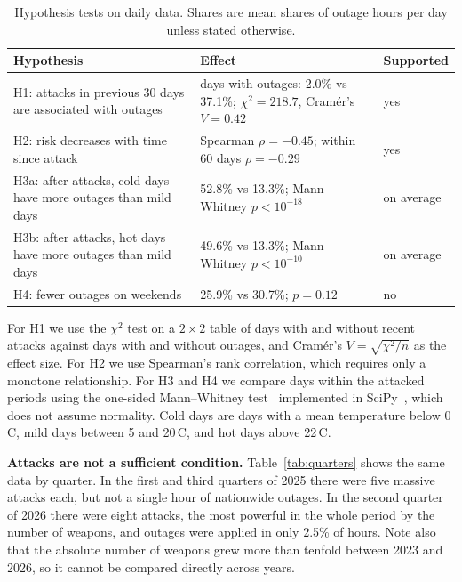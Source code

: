 \documentclass[9pt,twocolumn,letterpaper]{extarticle}
\begin{document}
\begin{table}[t]
\centering\small
\caption{Hypothesis tests on daily data. Shares are mean shares of outage hours per day unless stated otherwise.}
\label{tab:tests}
\begin{tabular}{@{}p{2.75cm}p{3.05cm}l@{}}
\toprule
Hypothesis & Effect & Supported \\
\midrule
H1: attacks in previous 30 days are associated with outages & days with outages: 2.0\% vs 37.1\%; $\chi^2 = 218.7$, Cram\'er's $V = 0.42$ & yes \\
\addlinespace
H2: risk decreases with time since attack & Spearman $\rho = -0.45$; within 60 days $\rho = -0.29$ & yes \\
\addlinespace
H3a: after attacks, cold days have more outages than mild days & 52.8\% vs 13.3\%; Mann--Whitney $p < 10^{-18}$ & on average \\
\addlinespace
H3b: after attacks, hot days have more outages than mild days & 49.6\% vs 13.3\%; Mann--Whitney $p < 10^{-10}$ & on average \\
\addlinespace
H4: fewer outages on weekends & 25.9\% vs 30.7\%; $p = 0.12$ & no \\
\bottomrule
\end{tabular}
\end{table}

For H1 we use the $\chi^2$ test on a $2\times2$ table of days with and without recent attacks against days with and without outages, and Cram\'er's $V=\sqrt{\chi^2/n}$ as the effect size. For H2 we use Spearman's rank correlation, which requires only a monotone relationship. For H3 and H4 we compare days within the attacked periods using the one-sided Mann--Whitney test~\cite{mann} implemented in SciPy~\cite{scipy}, which does not assume normality. Cold days are days with a mean temperature below 0\,\textdegree C, mild days between 5 and 20\,\textdegree C, and hot days above 22\,\textdegree C.

\textbf{Attacks are not a sufficient condition.} Table~\ref{tab:quarters} shows the same data by quarter. In the first and third quarters of 2025 there were five massive attacks each, but not a single hour of nationwide outages. In the second quarter of 2026 there were eight attacks, the most powerful in the whole period by the number of weapons, and outages were applied in only 2.5\% of hours. Note also that the absolute number of weapons grew more than tenfold between 2023 and 2026, so it cannot be compared directly across years.
\end{document}
